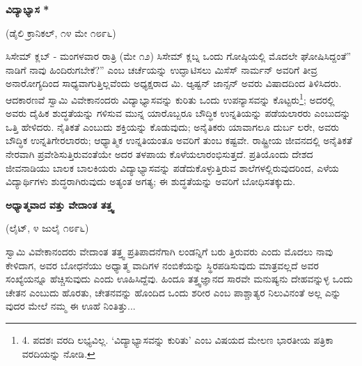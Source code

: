 \begin{center}
\textbf{ವಿದ್ಯಾಭ್ಯಾಸ *}
\end{center}

\begin{center}
(ಡೈಲಿ ಕ್ರಾನಿಕಲ್, ೧೪ ಮೇ ೧೮೯೬)
\end{center}

ಸಿಸೇಮ್​ ಕ್ಲಬ್ - ಮಂಗಳವಾರ ರಾತ್ರಿ (ಮೇ ೧೨) ಸಿಸೇಮ್​ ಕ್ಲಬ್ನ ಒಂದು ಗೋಷ್ಠಿಯಲ್ಲಿ ಮೊದಲೇ ಘೋಷಿಸಿದ್ದಂತೆ” ನಾಡಿಗೆ ನಾವು ಹಿಂದಿರುಗಬೇಕೆ?” ಎಂಬ ಚರ್ಚೆಯನ್ನು ಉದ್ಘಾಟಿಸಲು ಮಿಸೆಸ್ ನಾರ್ಮನ್ ಅವರಿಗೆ ತೀವ್ರ ಅನಾರೋಗ್ಯದಿಂದ ಸಾಧ್ಯವಾಗುತ್ತಿಲ್ಲವೆಂದು ಅಧ್ಯಕ್ಷರಾದ ಮಿ. ಆ್ಯಷ್ಟನ್ ಜಾನ್ಸನ್ ಅವರು ವಿಷಾದದಿಂದ ತಿಳಿಸಿದರು. ಆದಕಾರಣವೆ ಸ್ವಾಮಿ ವಿವೇಕಾನಂದರು ವಿದ್ಯಾಭ್ಯಾಸವನ್ನು ಕುರಿತು ಒಂದು ಉಪನ್ಯಾಸವನ್ನು ಕೊಟ್ಟರು\footnote{4. ಪದಶಃ ವರದಿ ಲಭ್ಯವಿಲ್ಲ. ‘ವಿದ್ಯಾಭ್ಯಾಸವನ್ನು ಕುರಿತು’ ಎಂಬ ವಿಷಯದ ಮೇಲಣ ಭಾರತೀಯ ಪತ್ರಿಕಾ ವರದಿಯನ್ನು ನೋಡಿ.}; ಅದರಲ್ಲಿ ಅವರು ದೈಹಿಕ ಶುದ್ಧತೆಯನ್ನು ಗಳಿಸುವ ಮುನ್ನ ಯಾರೊಬ್ಬರೂ ಬೌದ್ಧಿಕ ಉನ್ನತಿಯನ್ನು ಪಡೆಯಲಾರರು ಎಂಬುದನ್ನು ಒತ್ತಿ ಹೇಳಿದರು. ನೈತಿಕತೆ ಎಂಬುದು ಶಕ್ತಿಯನ್ನು ಕೊಡುವುದು; ಅನೈತಿಕರು ಯಾವಾಗಲೂ ದುರ್ಬ ಲರೇ, ಅವರು ಬೌದ್ಧಿಕ ಉನ್ನತಿಗೇರಲಾರರು; ಆಧ್ಯಾತ್ಮಿಕ ಉನ್ನತಿಯಂತೂ ಅವರಿಗೆ ತುಂಬ ಕಷ್ಟವೇ. ರಾಷ್ಟ್ರೀಯ ಜೀವನದಲ್ಲಿ ಅನೈತಿಕತೆ ನೇರವಾಗಿ ಪ್ರವೇಶಿಸುತ್ತಿರುವಂತೆಯೇ ಅದರ ತಳಪಾಯ ಕೊಳೆಯಲಾರಂಭಿಸುತ್ತದೆ. ಪ್ರತಿಯೊಂದು ದೇಶದ ಜೀವನಾಡಿಯು ಬಾಲಕ ಬಾಲಕಿಯರು ವಿದ್ಯಾಭ್ಯಾಸವನ್ನು ಪಡೆದುಕೊಳ್ಳುತ್ತಿರುವ ಶಾಲೆಗಳಲ್ಲಿರುವುದರಿಂದ, ಎಳೆಯ ವಿದ್ಯಾರ್ಥಿಗಳು ಶುದ್ಧರಾಗಿರುವುದು ಅತ್ಯಂತ ಅಗತ್ಯ; ಈ ಶುದ್ಧತೆಯನ್ನು ಅವರಿಗೆ ಬೋಧಿಸತಕ್ಕುದು.

\begin{center}
\textbf{ಅಧ್ಯಾತ್ಮವಾದ ವತ್ತು ವೇದಾಂತ ತತ್ತ್ವ}
\end{center}

\begin{center}
(ಲೈಟ್, ೪ ಜುಲೈ ೧೮೯೬)
\end{center}

ಸ್ವಾಮಿ ವಿವೇಕಾನಂದರು ವೇದಾಂತ ತತ್ತ್ವ ಪ್ರತಿಪಾದನೆಗಾಗಿ ಲಂಡನ್ನಿಗೆ ಬರು ತ್ತಿರುವರು ಎಂದು ಮೊದಲು ನಾವು ಕೇಳಿದಾಗ, ಅವರ ಬೋಧನೆಯು ಅಧ್ಯಾತ್ಮ ವಾದಿಗಳ ನಂಬಿಕೆಯನ್ನು ಸ್ಥಿರಪಡಿಸುವುದು ಮಾತ್ರವಲ್ಲದೆ ಅವರ ಸಂಖ್ಯೆಯನ್ನೂ ಹೆಚ್ಚಿಸುವುದು ಎಂದು ಊಹಿಸಿದ್ದೆವು. ಹಿಂದೂ ತತ್ತ್ವಜ್ಞಾನದ ಸಾರವೇ ಮನುಷ್ಯನು ದೇಹವನ್ನುಳ್ಳ ಒಂದು ಚೇತನ ಎಂಬುದು ಹೊರತು, ಚೇತನವನ್ನು ಹೊಂದಿದ ಒಂದು ಶರೀರ ಎಂಬ ಪಾಶ್ಚಾತ್ಯರ ನಿಲುವಿನಂತೆ ಅಲ್ಲ ಎನ್ನು ವುದರ ಮೇಲೆ ನಮ್ಮ ಈ ಊಹೆ ನಿಂತಿತ್ತು...

